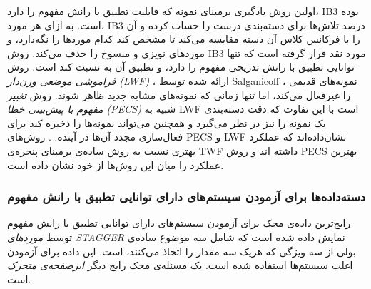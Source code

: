 
اولین روش یادگیری برمبنای نمونه که قابلیت تطبیق با رانش مفهوم را دارد، 
IB3
\cite{ahaetal1991} 
بوده است. به ازای هر مورد، 
IB3 
درصد تلاش‌ها برای دسته‌بندی درست را حساب کرده و آن را با فرکانس کلاس آن دسته مقایسه می‌کند تا مشخص کند کدام موردها را نگه‌دارد، و موردهای نویزی و منسوخ
را حذف می‌کند. روش 
IB3 
مورد نقد قرار گرفته است که تنها توانایی تطبیق با رانش تدریجی مفهوم را دارد، و تطبیق آن به نسبت کند است.
\cite{widmerkubat1996} 
روش 
\textit{
فراموشی موضعی وزن‌دار
(LWF)
} 
، 
ارائه شده توسط 
Salganicoff \cite{salganicoff1997}، 
نمونه‌های قدیمی را غیرفعال
می‌کند، اما تنها زمانی که نمونه‌های مشابه جدید ظاهر شوند. روش 
\textit{
تغییر مفهوم با پیش‌بینی خطا
(PECS)
}
شبیه به 
LWF 
است با این تفاوت که دقت دسته‌بندی یک نمونه را نیز در نظر می‌گیرد و همچنین می‌تواند نمونه‌ها را ذخیره کند برای فعال‌سازی مجدد آن‌ها در آینده.
\cite{salganicoff1997}. 
روش‌های 
PECS 
و 
LWF 
نشان‌داده‌اند که عملکرد بهتری نسبت به روش ساده‌ی برمبنای پنجره‌ی 
TWF 
داشته اند و روش 
PECS 
بهترین عملکرد را میان این روش‌ها از خود نشان داده است.



\subsubsection{
دسته‌داده‌ها برای آزمودن سیستم‌های دارای توانایی تطبیق با رانش مفهوم
}
رایج‌ترین داده‌ی محک
برای آزمودن سیستم‌های دارای توانایی تطبیق با رانش مفهوم توسط 
\textit{
موردهای 
STAGGER
}
نمایش داده شده است که شامل سه موضوع ساده‌ی بولی
از سه ویژگی که هریک سه مقدار را اتخاذ می‌کنند، است. این داده برای آزمودن اغلب سیستم‌ها استفاده شده است.
\cite{schlimmergranger1986} \cite{widmerkubat1993} \cite{widmerkubat1996} \cite{kubatwidmer1994} \cite{harriessammut1998} \cite{stanley2003} \cite{koltermaloof2003} 
یک مسئله‌ی محک رایج دیگر 
\textit{
ابرصفحه‌ی متحرک
}
است.
\cite{hultenetal2001} \cite{streetkim2001} \cite{koltermaloof2003} \cite{wangetal2003}

